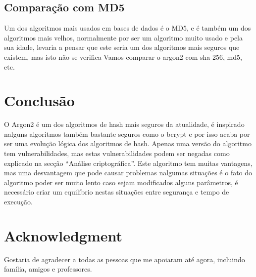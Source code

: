 \documentclass[conference]{IEEEtran}
\begin{document}
\subsection{Comparação com MD5}

Um dos algoritmos mais usados em bases de dados é o MD5, e é também um dos algoritmos mais velhos, 
normalmente por ser um algoritmo muito usado e pela sua idade, levaria a pensar que 
este seria um dos algoritmos mais seguros que existem, mas isto não se verifica 
Vamos comparar o argon2 com sha-256, md5, etc.

\section{Conclusão}

O Argon2 é um dos algoritmos de hash mais seguros da atualidade, é inspirado nalguns 
algoritmos também bastante seguros como o bcrypt e por isso acaba por ser uma 
evolução lógica dos algoritmos de hash. Apenas uma versão do algoritmo tem 
vulnerabilidades, mas estas vulnerabilidades podem ser negadas como explicado na 
secção “Análise criptográfica”. Este algoritmo tem muitas vantagens, mas uma 
desvantagem que pode causar problemas nalgumas situações é o fato do algoritmo 
poder ser muito lento caso sejam modificados alguns parâmetros, é necessário 
criar um equilíbrio nestas situações entre segurança e tempo de execução.

\section*{Acknowledgment}

Gostaria de agradecer a todas as pessoas que me apoiaram até agora, incluindo
família, amigos e professores.



\end{document}
